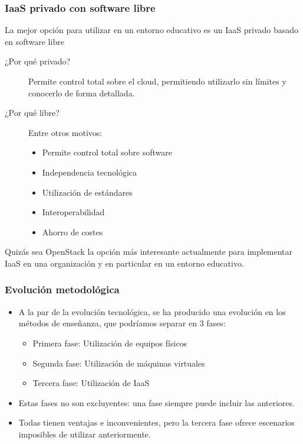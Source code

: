 \documentclass{beamer}
\begin{document}
\begin{frame}
  \frametitle{IaaS privado con software libre}
  La mejor opción para utilizar en un entorno educativo es un IaaS
  privado basado en software libre
  \begin{description}
  \item[¿Por qué privado?] Permite control total sobre el cloud,
    permitiendo utilizarlo sin límites y conocerlo de forma detallada.
  \item[¿Por qué libre?] Entre otros motivos:
    \begin{itemize}
    \item Permite control total sobre software
    \item Independencia tecnológica
    \item Utilización de estándares
    \item Interoperabilidad
    \item Ahorro de costes
    \end{itemize}
  \end{description}
Quizás sea OpenStack la opción más interesante actualmente para
implementar IaaS en una organización y en particular en un entorno
educativo.
\end{frame}

\begin{frame}
  \frametitle{Evolución metodológica}
  \begin{itemize}
  \item A la par de la evolución tecnológica, se ha producido una evolución en
    los métodos de enseñanza, que podríamos separar en 3 fases:
    \begin{itemize}
    \item Primera fase: Utilización de equipos físicos
    \item Segunda fase: Utilización de máquinas virtuales
    \item Tercera fase: Utilización de IaaS
    \end{itemize}
  \item Estas fases no son excluyentes: una fase siempre puede incluir las
    anteriores.
  \item Todas tienen ventajas e inconvenientes, pero la tercera fase ofrece
    escenarios imposibles de utilizar anteriormente.

  \end{itemize}
\end{frame}
\end{document}
